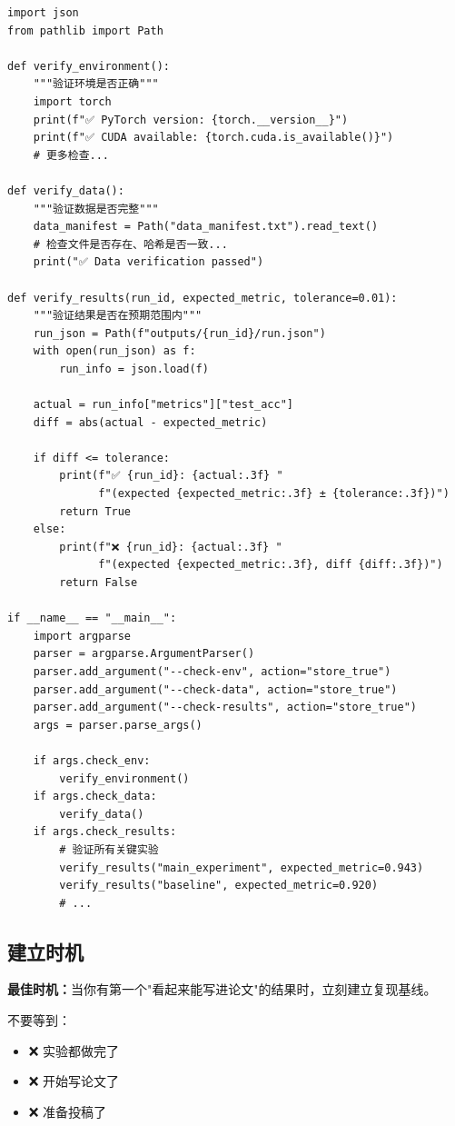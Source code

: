 \begin{verbatim}
import json
from pathlib import Path

def verify_environment():
    """验证环境是否正确"""
    import torch
    print(f"✅ PyTorch version: {torch.__version__}")
    print(f"✅ CUDA available: {torch.cuda.is_available()}")
    # 更多检查...

def verify_data():
    """验证数据是否完整"""
    data_manifest = Path("data_manifest.txt").read_text()
    # 检查文件是否存在、哈希是否一致...
    print("✅ Data verification passed")

def verify_results(run_id, expected_metric, tolerance=0.01):
    """验证结果是否在预期范围内"""
    run_json = Path(f"outputs/{run_id}/run.json")
    with open(run_json) as f:
        run_info = json.load(f)

    actual = run_info["metrics"]["test_acc"]
    diff = abs(actual - expected_metric)

    if diff <= tolerance:
        print(f"✅ {run_id}: {actual:.3f} "
              f"(expected {expected_metric:.3f} ± {tolerance:.3f})")
        return True
    else:
        print(f"❌ {run_id}: {actual:.3f} "
              f"(expected {expected_metric:.3f}, diff {diff:.3f})")
        return False

if __name__ == "__main__":
    import argparse
    parser = argparse.ArgumentParser()
    parser.add_argument("--check-env", action="store_true")
    parser.add_argument("--check-data", action="store_true")
    parser.add_argument("--check-results", action="store_true")
    args = parser.parse_args()

    if args.check_env:
        verify_environment()
    if args.check_data:
        verify_data()
    if args.check_results:
        # 验证所有关键实验
        verify_results("main_experiment", expected_metric=0.943)
        verify_results("baseline", expected_metric=0.920)
        # ...
\end{verbatim}

\subsection{建立时机}

\textbf{最佳时机：}当你有第一个"看起来能写进论文"的结果时，立刻建立复现基线。

不要等到：
\begin{itemize}
  \item ❌ 实验都做完了
  \item ❌ 开始写论文了
  \item ❌ 准备投稿了
\end{itemize}

